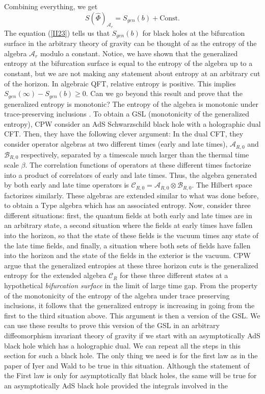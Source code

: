 \documentclass[12pt]{article}
\newcommand{\RomanNumeralCaps}[1]
    {\MakeUppercase{\romannumeral #1}}
\begin{document}
  Combining everything, we get
  \begin{equation}\label{II23}
  S(\hat{\Phi})_{\mathcal{A}_r}= S_{gen}(b)+ \textrm{Const} .
\end{equation}
  The equation (\ref{II23}) tells us that $S_{gen}(b)$ for black holes at the bifurcation surface in the arbitrary theory of gravity can be thought of as the entropy of the algebra $\mathcal{A}_r$ modulo a constant. Notice, we have shown that the generalized entropy at the bifurcation surface is equal to the entropy of the algebra up to a constant, but we are not making any statement about entropy at an arbitrary cut of the horizon. In algebraic QFT, relative entropy is positive. This implies $S_{gen}(\infty)-S_{gen}(b) \geq 0$. Can we go beyond this result and prove that the generalized entropy is monotonic? The entropy of the algebra is monotonic under trace-preserving inclusions \cite{LW}. To obtain a GSL (monotonicity of the generalized entropy), CPW consider an AdS Schwarzschild black hole with a holographic dual CFT. Then, they have the following clever argument: In the dual CFT, they consider operator algebras at two different times (early and late times), $\mathcal{A}_{R,0}$ and $\mathcal{B}_{R,0}$ respectively, separated by a timescale much larger than the thermal time scale $\beta$. The correlation functions of operators at these different times factorize into a product of correlators of early and late times. Thus, the algebra generated by both early and late time operators is $\mathcal{C}_{R,0} = \mathcal{A}_{R,0} \otimes \mathcal{B}_{R,0}$. The Hilbert space factorizes similarly. These algebras are extended similar to what was done before, to obtain a Type \RomanNumeralCaps {2} algebra which has an associated entropy. Now, consider three different situations: first, the quantum fields at both early and late times are in an arbitrary state, a second situation where the fields at early times have fallen into the horizon, so that the state of these fields is the vacuum times any state of the late time fields, and finally, a situation where both sets of fields have fallen into the horizon and the state of the fields in the exterior is the vacuum. CPW argue that the generalized entropies at these three horizon cuts is the generalized entropy for the extended algebra $\mathcal{C}_{R}$ for these three different states at a hypothetical  \emph{bifurcation surface} in the limit of large time gap. From the property of the monotonicity of the entropy of the algebra under trace preserving inclusions, it follows that the generalized entropy is increasing in going from the first to the third situation above. This argument is then a version of the GSL. We can use these results to prove this version of the GSL in an arbitrary diffeomorphism invariant theory of gravity if we start with an asymptotically AdS black hole which has a holographic dual. We can repeat all the steps in this section for such a black hole. The only thing we need is for the first law as in the paper of Iyer and Wald \cite{VR} to be true in this situation. Although the statement of the First law is only for asymptotically flat black holes, the same will be true for an asymptotically AdS black hole provided the integrals involved in the 
\end{document}
